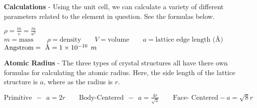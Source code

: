 \documentclass{article}
\begin{document}
\begin{minipage}{2cm}
			
		\end{minipage}
		
		\noindent\textbf{Calculations} - Using the unit cell, we can calculate a variety of different parameters related to the element in question. See the formulas below.
		\begin{qq}
			
			\begin{center}
				$ \rho= \frac{m}{v}=\frac{m}{a^3}$\\
				\vspace{3pt}
				$m=\text{mass}\qquad \rho=\text{density} \qquad V=\text{volume}\qquad a=\text{lattice edge length (\AA)}$\\
				\vspace{3pt}
				$\text{Angstrom}=\textup{~\AA}=1\times 10^{-10} \:\: m$
			\end{center}	
			
		\end{qq}
		
		\vspace{10pt}
		\noindent\textbf{Atomic Radius} - The three types of crystal structures all have there own formulas for calculating the atomic radius. Here, the side length of the lattice structure is $a$, where as the radius is $r$.
		\begin{qq}
			
			\begin{center}
				$ \text{Primitive}\:\: - \:\: a=2r \qquad \text{Body-Centered}\:\: - \:\: a=\frac{4r}{\sqrt{3}}\qquad \text{Face- Centered} - a=\sqrt{8}r$
			\end{center}
		
		\end{qq}
		
\end{document}
